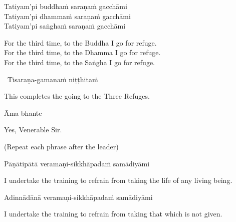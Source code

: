 Tatiyam'pi buddhaṁ saraṇaṁ gacchāmi\\
Tatiyam'pi dhammaṁ saraṇaṁ gacchāmi\\
Tatiyam'pi saṅghaṁ saraṇaṁ gacchāmi

\begin{english-verses}
  For the third time, to the Buddha I go for refuge.\\
  For the third time, to the Dhamma I go for refuge.\\
  For the third time, to the Saṅgha I go for refuge.
\end{english-verses}

\begin{leader-only}
  \anglebracketleft\ \hspace{-0.5mm}Tisaraṇa-gamanaṁ niṭṭhitaṁ \hspace{-0.5mm}\anglebracketright\
\end{leader-only}

\begin{english}
  This completes the going to the Three Refuges.
\end{english}

Āma bhante

\begin{english}
  Yes, Venerable Sir.
\end{english}

\clearpage

\begin{center}
  \textbf{}
\end{center}

\begin{center}
  (Repeat each phrase after the leader)
\end{center}

Pāṇātipātā veramaṇi-sikkhāpadaṁ samādiyāmi

\begin{english-hang}
  I undertake the training\makeatletter\hyperlink{endnote139-appendix}\makeatother
  to refrain from taking the life of any living being.
\end{english-hang}

Adinnādānā veramaṇi-sikkhāpadaṁ samādiyāmi

\begin{english}
  I undertake the training to refrain from taking that which is not given.
\end{english}

